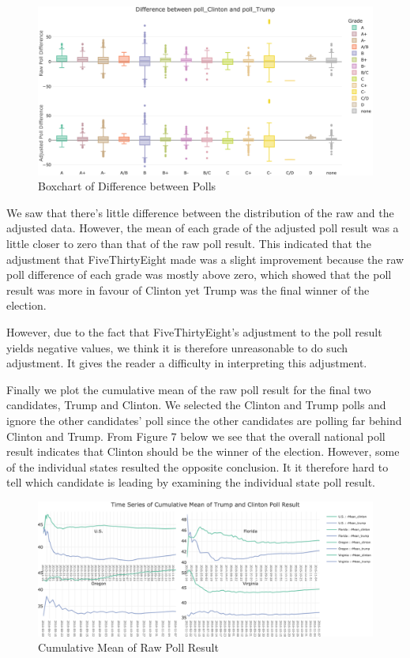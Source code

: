 \documentclass[
  11pt,
]{article}
\begin{document}
\begin{figure}
\centering
\includegraphics{./Figures/boxchart.png}
\caption{Boxchart of Difference between Polls}
\end{figure}

We saw that there's little difference between the distribution of the
raw and the adjusted data. However, the mean of each grade of the
adjusted poll result was a little closer to zero than that of the raw
poll result. This indicated that the adjustment that FiveThirtyEight
made was a slight improvement because the raw poll difference of each
grade was mostly above zero, which showed that the poll result was more
in favour of Clinton yet Trump was the final winner of the election.

However, due to the fact that FiveThirtyEight's adjustment to the poll
result yields negative values, we think it is therefore unreasonable to
do such adjustment. It gives the reader a difficulty in interpreting
this adjustment.

Finally we plot the cumulative mean of the raw poll result for the final
two candidates, Trump and Clinton. We selected the Clinton and Trump
polls and ignore the other candidates' poll since the other candidates
are polling far behind Clinton and Trump. From Figure 7 below we see
that the overall national poll result indicates that Clinton should be
the winner of the election. However, some of the individual states
resulted the opposite conclusion. It it therefore hard to tell which
candidate is leading by examining the individual state poll result.

\begin{figure}
\centering
\includegraphics{./Figures/cMeanchart.png}
\caption{Cumulative Mean of Raw Poll Result}
\end{figure}
\end{document}
